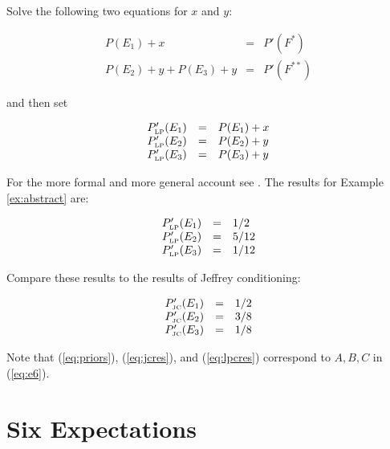 \documentclass[11pt]{article}
\begin{document}
Solve the following two equations for $x$ and $y$:

\begin{equation}
  \label{eq:lpce}
  \begin{array}{rcl}
    P(E_{1})+x&=&P'(F^{*}) \\
    P(E_{2})+y+P(E_{3})+y&=&P'(F^{**})
  \end{array}
\end{equation}

and then set

\begin{equation}
  \label{eq:lpcf}
  \begin{array}{rcl}
    P'_{\mbox{\tiny LP}}(E_{1})&=&P(E_{1})+x \\
    P'_{\mbox{\tiny LP}}(E_{2})&=&P(E_{2})+y \\
    P'_{\mbox{\tiny LP}}(E_{3})&=&P(E_{3})+y
  \end{array}
\end{equation}

For the more formal and more general account see
. The results for Example
\ref{ex:abstract} are:

\begin{equation}
  \label{eq:lpcres}
  \begin{array}{rcl}
    P'_{\mbox{\tiny LP}}(E_{1})&=&1/2 \\
    P'_{\mbox{\tiny LP}}(E_{2})&=&5/12 \\
    P'_{\mbox{\tiny LP}}(E_{3})&=&1/12
  \end{array}
\end{equation}

Compare these results to the results of Jeffrey conditioning:

\begin{equation}
  \label{eq:jcres}
  \begin{array}{rcl}
    P'_{\mbox{\tiny JC}}(E_{1})&=&1/2 \\
    P'_{\mbox{\tiny JC}}(E_{2})&=&3/8 \\
    P'_{\mbox{\tiny JC}}(E_{3})&=&1/8
  \end{array}
\end{equation}

Note that (\ref{eq:priors}), (\ref{eq:jcres}), and (\ref{eq:lpcres})
correspond to $A,B,C$ in (\ref{eq:e6}). 

\section{Six Expectations}
\label{fivex}
\end{document}
